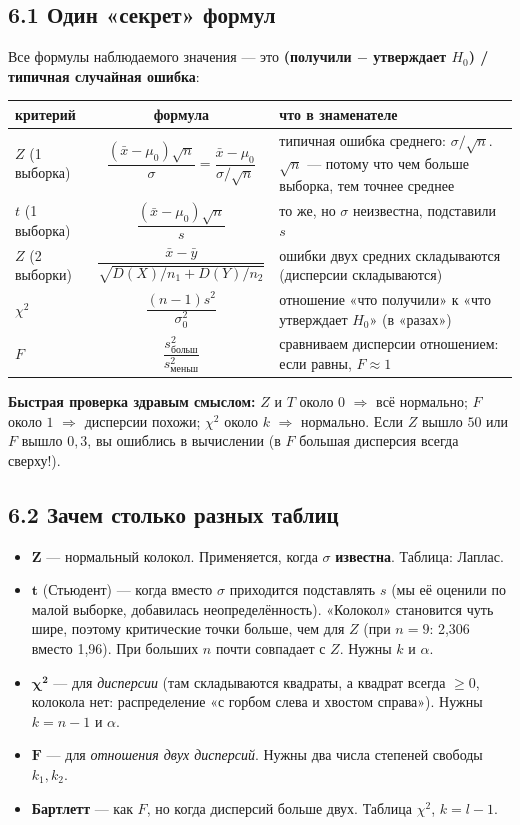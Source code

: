 \documentclass[a4paper,11pt]{extarticle}
\begin{document}
\subsection*{6.1 Один «секрет» формул}
Все формулы наблюдаемого значения --- это \textbf{(получили $-$ утверждает $H_0$) / типичная случайная ошибка}:
\begin{center}
\renewcommand{\arraystretch}{1.5}
\begin{tabular}{|l|c|p{5.6cm}|}\hline
критерий & формула & что в знаменателе\\\hline
$Z$ (1 выборка) & $\dfrac{(\bar x-\mu_0)\sqrt n}{\sigma}=\dfrac{\bar x-\mu_0}{\sigma/\sqrt n}$ & типичная ошибка среднего: $\sigma/\sqrt n$. $\sqrt n$ --- потому что чем больше выборка, тем точнее среднее\\\hline
$t$ (1 выборка) & $\dfrac{(\bar x-\mu_0)\sqrt n}{s}$ & то же, но $\sigma$ неизвестна, подставили $s$\\\hline
$Z$ (2 выборки) & $\dfrac{\bar x-\bar y}{\sqrt{D(X)/n_1+D(Y)/n_2}}$ & ошибки двух средних складываются (дисперсии складываются)\\\hline
$\chi^2$ & $\dfrac{(n-1)s^2}{\sigma_0^2}$ & отношение «что получили» к «что утверждает $H_0$» (в «разах»)\\\hline
$F$ & $\dfrac{s^2_{\text{больш}}}{s^2_{\text{меньш}}}$ & сравниваем дисперсии отношением: если равны, $F\approx1$\\\hline
\end{tabular}
\end{center}
\textbf{Быстрая проверка здравым смыслом:} $Z$ и $T$ около $0$ $\Rightarrow$ всё нормально; $F$ около $1$ $\Rightarrow$ дисперсии похожи; $\chi^2$ около $k$ $\Rightarrow$ нормально. Если $Z$ вышло $50$ или $F$ вышло $0{,}3$, вы ошиблись в вычислении (в $F$ большая дисперсия всегда сверху!).

\subsection*{6.2 Зачем столько разных таблиц}
\begin{itemize}
\item $\mathbf{Z}$ --- нормальный колокол. Применяется, когда $\sigma$ \textbf{известна}. Таблица: Лаплас.
\item $\mathbf{t}$ (Стьюдент) --- когда вместо $\sigma$ приходится подставлять $s$ (мы её оценили по малой выборке, добавилась неопределённость). «Колокол» становится чуть шире, поэтому критические точки больше, чем для $Z$ (при $n=9$: 2,306 вместо 1,96). При больших $n$ почти совпадает с $Z$. Нужны $k$ и $\alpha$.
\item $\boldsymbol{\chi^2}$ --- для \emph{дисперсии} (там складываются квадраты, а квадрат всегда $\ge0$, колокола нет: распределение «с горбом слева и хвостом справа»). Нужны $k=n-1$ и $\alpha$.
\item $\mathbf{F}$ --- для \emph{отношения двух дисперсий}. Нужны два числа степеней свободы $k_1,k_2$.
\item \textbf{Бартлетт} --- как $F$, но когда дисперсий больше двух. Таблица $\chi^2$, $k=l-1$.
\end{itemize}
\end{document}
